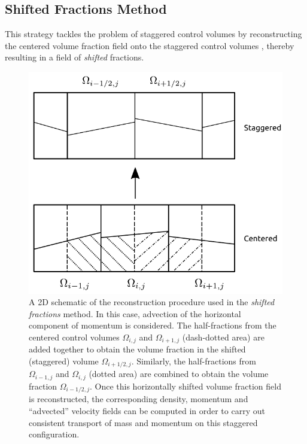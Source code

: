 \subsection*{Shifted Fractions Method}

This strategy tackles the problem of staggered control volumes by reconstructing 
the centered volume fraction field onto the staggered control volumes 
, thereby resulting in a field of \textit{shifted} fractions. 


\begin{figure}
\begin{center}
\includegraphics[width=\textwidth]{plots/shifted_fractions.pdf}
\end{center}
\caption{A 2D schematic of the reconstruction procedure 
used in the \textit{shifted fractions} method. 
In this case, advection of the horizontal component of momentum is considered.
The half-fractions from the centered control volumes 
$\Omega_{i,j}$ and $\Omega_{i+1,j}$ (dash-dotted area) are added together
to obtain the volume fraction in the shifted (staggered) volume $\Omega_{i+1/2,j}$.
Similarly, the half-fractions from $\Omega_{i-1,j}$ and $\Omega_{i,j}$ (dotted area)
are combined to obtain the volume fraction $\Omega_{i-1/2,j}$.
Once this horizontally shifted volume fraction field is reconstructed, 
the corresponding density, momentum and ``advected'' velocity fields can be 
computed in order to carry out consistent transport of mass and momentum
on this staggered configuration. 
}
\label{shift_frac}
\end{figure}


